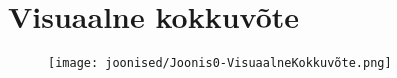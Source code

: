 \newpage
{} %
\section*{Visuaalne kokkuvõte}

\begin{figure}[ht]
    \centering
    \texttt{[image: joonised/Joonis0-VisuaalneKokkuvõte.png]}
    \label{fig:visuaalne-kokkuvõte}
\end{figure}

\newpage
